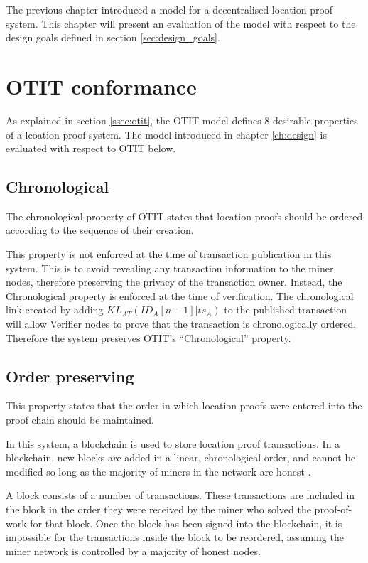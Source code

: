The previous chapter introduced a model for a decentralised location proof system. This chapter will present an evaluation of the model with respect to the design goals defined in section \ref{sec:design_goals}.

\section{OTIT conformance}
As explained in section \ref{ssec:otit}, the OTIT model \cite{otit} defines 8 desirable properties of a lcoation proof system. The model introduced in chapter \ref{ch:design} is evaluated with respect to OTIT below.

\subsection{Chronological}
The chronological property of OTIT states that location proofs should be ordered according to the sequence of their creation.

This property is not enforced at the time of transaction publication in this system. This is to avoid revealing any transaction information to the miner nodes, therefore preserving the privacy of the transaction owner. Instead, the Chronological property is enforced at the time of verification. The chronological link created by adding $KL_{AT}(ID_{A}[n-1]|ts_A)$ to the published transaction will allow Verifier nodes to prove that the transaction is chronologically ordered. Therefore the system preserves OTIT's ``Chronological'' property.

\subsection{Order preserving}
This property states that the order in which location proofs were entered into the proof chain should be maintained.

In this system, a blockchain is used to store location proof transactions. In a blockchain, new blocks are added in a linear, chronological order, and cannot be modified so long as the majority of miners in the network are honest \cite{blueprint}.

A block consists of a number of transactions. These transactions are included in the block in the order they were received by the miner who solved the proof-of-work for that block. Once the block has been signed into the blockchain, it is impossible for the transactions inside the block to be reordered, assuming the miner network is controlled by a majority of honest nodes.

